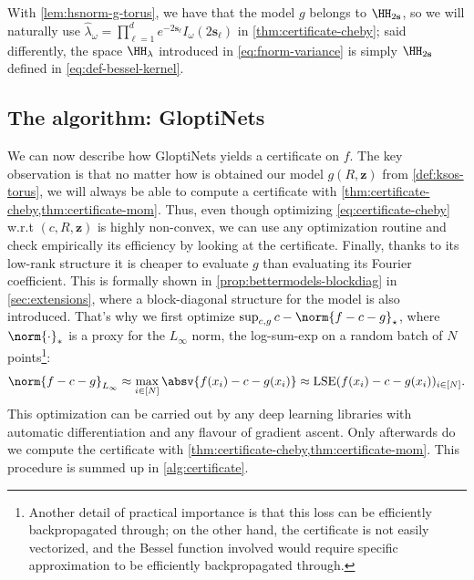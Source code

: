 \documentclass{article}
\begin{document}
With \cref{lem:hsnorm-g-torus}, we have that the model $g$ belongs to $\HH_{2 \mathbf{s}}$, so we will naturally use $\hat{\lambda}_\omega = \prod_{\ell = 1}^d e^{-2\mathbf{s}_\ell} I_{\omega}(2\mathbf{s}_\ell)$ in \cref{thm:certificate-cheby}; said differently, the space $\HH_\lambda$ introduced in \cref{eq:fnorm-variance} is simply $\HH_{2 \mathbf{s}}$ defined in \cref{eq:def-bessel-kernel}.

\subsection{The algorithm: GloptiNets}
\label{sec:algorithm}

We can now describe how GloptiNets yields a certificate on $f$. The key observation is that no matter how is obtained our model $g(R, \mathbf{z})$ from \cref{def:ksos-torus}, we will always be able to compute a certificate with \cref{thm:certificate-cheby,thm:certificate-mom}. Thus, even though optimizing \cref{eq:certificate-cheby} w.r.t $(c, R, \mathbf{z})$ is highly non-convex, we can use any optimization routine and check empirically its efficiency by looking at the certificate.
Finally, thanks to its low-rank structure it is cheaper to evaluate $g$ than evaluating its Fourier coefficient. This is formally shown in \cref{prop:bettermodels-blockdiag} in \cref{sec:extensions}, where a block-diagonal structure for the model is also introduced. That's why we first optimize $\sup_{c, g} c - \norm{f - c - g}_\star$, where $\norm{\cdot}_*$ is a proxy for the $L_\infty$ norm, \eg the log-sum-exp on a random batch of $N$ points\footnote{Another detail of practical importance is that this loss can be efficiently backpropagated through; on the other hand, the certificate is not easily vectorized, and the Bessel function involved would require specific approximation to be efficiently backpropagated through.}:
\begin{equation}
  \norm{f - c - g}_{L_\infty} \approx \max_{i \in [N]} \absv{f(x_i) - c - g(x_i)} \approx \mathrm{LSE} (f(x_i) - c - g(x_i))_{i \in [N]}.
\end{equation}
This optimization can be carried out by any deep learning libraries with automatic differentiation and any flavour of gradient ascent. Only afterwards do we compute the certificate with \cref{thm:certificate-cheby,thm:certificate-mom}. This procedure is summed up in \cref{alg:certificate}.
\end{document}
